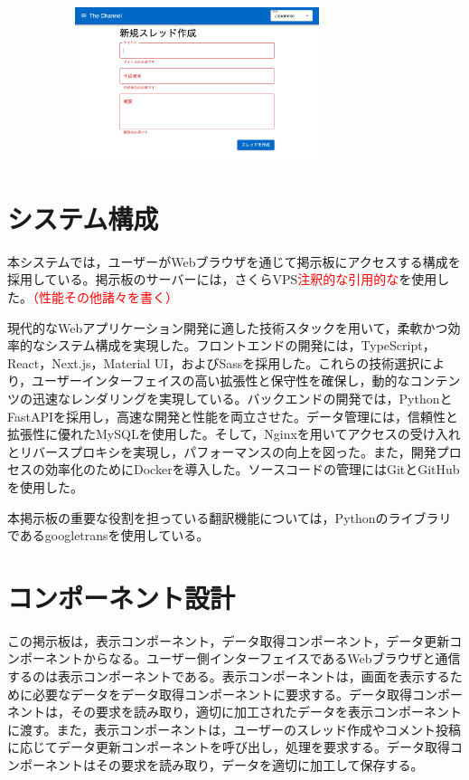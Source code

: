 \documentclass[b5paper,12pt]{jsreport}
\newcommand{\red}[1]{\textcolor{red}{#1}}
\begin{document}
\begin{figure}[htbp]
	\centering
	\includegraphics[width=90mm, height=45mm]{./img/thread_create_error.png}
\end{figure}


\section{システム構成}

本システムでは，ユーザーがWebブラウザを通じて掲示板にアクセスする構成を採用している。掲示板のサーバーには，さくらVPS\red{注釈的な引用的な}を使用した。\red{（性能その他諸々を書く）}

現代的なWebアプリケーション開発に適した技術スタックを用いて，柔軟かつ効率的なシステム構成を実現した。フロントエンドの開発には，TypeScript，React，Next.js，Material UI，およびSassを採用した。これらの技術選択により，ユーザーインターフェイスの高い拡張性と保守性を確保し，動的なコンテンツの迅速なレンダリングを実現している。バックエンドの開発では，PythonとFastAPIを採用し，高速な開発と性能を両立させた。データ管理には，信頼性と拡張性に優れたMySQLを使用した。そして，Nginxを用いてアクセスの受け入れとリバースプロキシを実現し，パフォーマンスの向上を図った。また，開発プロセスの効率化のためにDockerを導入した。ソースコードの管理にはGitとGitHubを使用した。

本掲示板の重要な役割を担っている翻訳機能については，Pythonのライブラリであるgoogletransを使用している。

\section{コンポーネント設計}

この掲示板は，表示コンポーネント，データ取得コンポーネント，データ更新コンポーネントからなる。ユーザー側インターフェイスであるWebブラウザと通信するのは表示コンポーネントである。表示コンポーネントは，画面を表示するために必要なデータをデータ取得コンポーネントに要求する。データ取得コンポーネントは，その要求を読み取り，適切に加工されたデータを表示コンポーネントに渡す。また，表示コンポーネントは，ユーザーのスレッド作成やコメント投稿に応じてデータ更新コンポーネントを呼び出し，処理を要求する。データ取得コンポーネントはその要求を読み取り，データを適切に加工して保存する。
\end{document}
